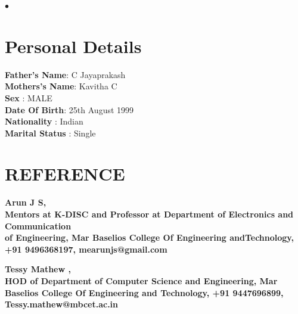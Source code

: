 \documentclass[margin,line]{res}
\newenvironment{list2}{
	\begin{list}{$\bullet$}{%
			\setlength{\itemsep}{0in}
			\setlength{\parsep}{0in} \setlength{\parskip}{0in}
			\setlength{\topsep}{0in} \setlength{\partopsep}{0in}
			\setlength{\leftmargin}{0.2in}}}{\end{list}}
\begin{document}
\begin{resume}
\begin{list2}
\end{list2}
\section{\sc Personal Details}
{\bf Father's Name}:  C Jayaprakash\\
{\bf Mothers's Name}:  Kavitha C\\
{\bf Sex}  :  MALE\\
{\bf Date Of Birth}:  25th August 1999\\
{\bf Nationality}       : Indian \\
{\bf Marital Status}       : Single \\

\section{\sc REFERENCE }

\bf Arun J S,\\ Mentors at K-DISC and
Professor at Department of Electronics and Communication\\ of Engineering, Mar Baselios College Of Engineering andTechnology, +91 9496368197, mearunjs@gmail.com

\bf Tessy Mathew ,\\ HOD of Department of Computer Science and Engineering, Mar Baselios College Of Engineering and Technology, +91 9447696899, Tessy.mathew@mbcet.ac.in
\end{resume}
\end{document}
